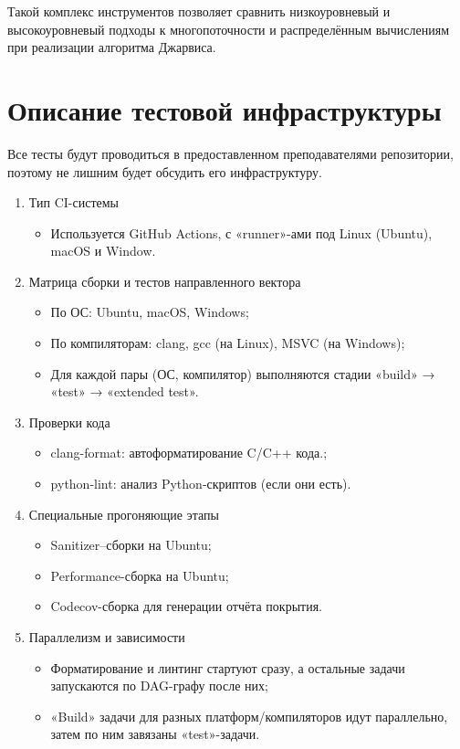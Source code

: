 \documentclass[12pt,a4paper]{article}
\begin{document}
Такой комплекс инструментов позволяет сравнить низкоуровневый и высокоуровневый подходы к многопоточности и распределённым вычислениям при реализации алгоритма Джарвиса.

\section{Описание тестовой инфраструктуры}
Все тесты будут проводиться в предоставленном преподавателями репозитории, поэтому не лишним будет обсудить его инфраструктуру.

\begin{enumerate}
  \item Тип CI-системы
  \begin{itemize}
    \item Используется GitHub Actions, с «runner»-ами под Linux (Ubuntu), macOS и Window.
  \end{itemize}
  \item Матрица сборки и тестов направленного вектора
  \begin{itemize}
    \item По ОС: Ubuntu, macOS, Windows;
    \item По компиляторам: clang, gcc (на Linux), MSVC (на Windows);
    \item Для каждой пары (ОС, компилятор) выполняются стадии «build» → «test» → «extended test».
  \end{itemize}
 \item Проверки кода
  \begin{itemize}
    \item clang-format: автоформатирование C/C++ кода.;
    \item python-lint: анализ Python-скриптов (если они есть).
  \end{itemize}
 \item Специальные прогоняющие этапы
  \begin{itemize}
    \item Sanitizer–сборки на Ubuntu;
    \item Performance-сборка на Ubuntu;
    \item Codecov-сборка для генерации отчёта покрытия.
  \end{itemize}
 \item Параллелизм и зависимости
  \begin{itemize}
    \item Форматирование и линтинг стартуют сразу, а остальные задачи запускаются по DAG-графу после них;
    \item «Build» задачи для разных платформ/компиляторов идут параллельно, затем по ним завязаны «test»-задачи.
  \end{itemize}
\end{enumerate}
\end{document}

